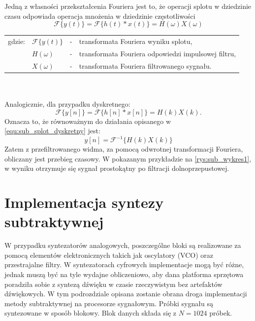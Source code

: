 Jedną z własności przekształcenia Fouriera jest to, że operacji splotu w dziedzinie czasu odpowiada operacja mnożenia w dziedzinie częstotliwości
\begin{equation} \label{equ:sub_splot_twierdzenie}
\mathcal{F}\{y(t)\} = \mathcal{F}\{h(t)*x(t)\} = H(\omega) X(\omega)
\end{equation}
\begin{tabular}{ l l l l}
	gdzie: & $\mathcal{F}\{y(t)\}$ &  - & transformata Fouriera wyniku splotu, \\
	&	$ H(\omega)$ & - &  transformata Fouriera odpowiedzi impulsowej filtru,\\
	&	$X(\omega)$ & - &  transformata Fouriera filtrowanego sygnału.\\
	
\end{tabular} \\ \\
Analogicznie, dla przypadku dyskretnego:
\begin{equation} \label{equ:sub_splot_twierdzenie_dyskretne}
\mathcal{F}\{y[n]\} = \mathcal{F}\{h[n]*x[n]\} = H(k) X(k).
\end{equation}
Oznacza to, że równoważnym do działania opisanego w \ref{equ:sub_splot_dyskretny} jest:
\begin{equation} \label{equ:sub_splot_dyskretny2}
y[n] = \mathcal{F}^{-1}\{ H(k) X(k)\} 
\end{equation}
Zatem z przefiltrowanego widma, za pomocą odwrotnej transformacji Fouriera, obliczany jest przebieg czasowy. W pokazanym przykładzie na \ref{rys:sub_wykres1}, w wyniku otrzymuje się sygnał prostokątny po filtracji dolnoprzepustowej.
\section{Implementacja syntezy subtraktywnej}
W przypadku syntezatorów analogowych, poszczególne bloki są realizowane za pomocą elementów elektronicznych takich jak oscylatory (VCO) oraz przestrajalne filtry. W syntezatorach cyfrowych implementacje mogą być różne, jednak muszą być na tyle wydajne obliczeniowo, aby dana platforma sprzętowa poradziła sobie z syntezą dźwięku w czasie rzeczywistym bez artefaktów dźwiękowych. W tym podrozdziale opisana zostanie obrana droga implementacji metody subtraktywnej na procesorze sygnałowym. 
Próbki sygnału są syntezowane w sposób blokowy. Blok danych składa się z $N=1024$ próbek.


